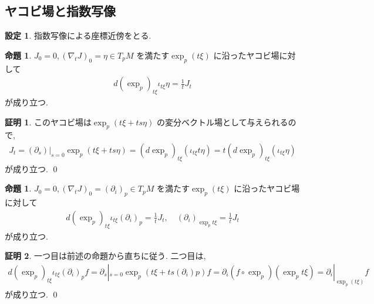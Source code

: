 \documentclass[10pt, fleqn, label-section=none]{bxjsarticle}
\theoremstyle{definition}
\newtheorem{prop}[dfn]{命題}
\newtheorem{setting}[dfn]{設定}
\newtheorem*{pf*}{証明}
\renewcommand{\;}{\, ; \,}
\begin{document}
\subsection{ヤコビ場と指数写像}

\begin{setting}
指数写像による座標近傍をとる. 
\end{setting}

\begin{prop}$J_0 = 0, (\nabla_t J)_0 = \eta \in T_pM$ を満たす$\exp_p (t\xi)$ に沿ったヤコビ場に対して
\begin{align*} d(\exp_p)_{t\xi} \iota_{ t \xi} \eta = \frac{1}{t} J_t \end{align*} 
が成り立つ. 
\end{prop}
\begin{pf*}このヤコビ場は$\exp_p(t\xi + ts \eta)$ の変分ベクトル場として与えられるので, 
\begin{align*} J_t = (\partial_s)|_{s = 0} \exp_p (t \xi + ts \eta) = (d\exp_p)_{t \xi} (\iota_{t\xi} t \eta) =  t (d\exp_p)_{t \xi} (\iota_{t\xi}  \eta) \end{align*}
が成り立つ. 
\qed
\end{pf*}

\begin{prop}$J_0 = 0, (\nabla_t J)_0 = (\partial_i)_p \in T_p M $ を満たす$\exp_p (t\xi)$ に沿ったヤコビ場に対して
\begin{align*} d(\exp_p)_{t\xi} \iota_{ t \xi} (\partial_i)_p = \frac{1}{t} J_t, \quad  (\partial_i)_{\exp_p t\xi} = \frac{1}{t} J_t \end{align*} 
が成り立つ. 
\end{prop}
\begin{pf*}一つ目は前述の命題から直ちに従う. 二つ目は, 
\begin{align*} d(\exp_p)_{t\xi} \iota_{t \xi} (\partial_i)_p f = \partial_s|_{s = 0} \exp_p (t \xi + ts (\partial_i)p) f = \partial_ i (f \circ \exp_p) (\exp_p t\xi) = \partial_i |_{\exp_p (t\xi)} f  \end{align*}
が成り立つ. 
\qed
\end{pf*}
\end{document}
